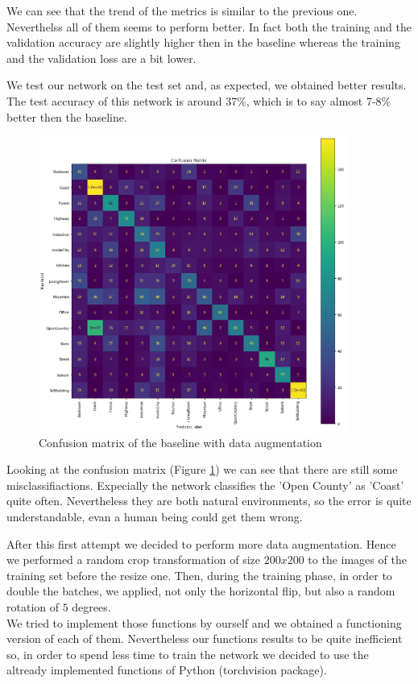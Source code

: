 \documentclass[12pt, a4paper]{report}
\begin{document}
We can see that the trend of the metrics is similar to the previous one. Neverthelss all of them seems to perform better. In fact both the training and the validation accuracy are slightly higher then in the baseline whereas the training and the validation loss are a bit lower. 

We test our network on the test set and, as expected, we obtained better results.\\
The test accuracy of this network is around 37\%, which is to say almost 7-8\% better then the baseline.

\begin{figure}[h!]
	\centering
	\includegraphics[width=0.9\textwidth]{img/aug_cmatrix}
	\caption{Confusion matrix of the baseline with data augmentation}
	\label{fig:augcmatrix}
\end{figure}

Looking at the confusion matrix (Figure \ref{fig:augcmatrix}) we can see that there are still some misclassifiactions. Expecially the network classifies the 'Open County' as 'Coast' quite often. Nevertheless they are both natural environments, so the error is quite understandable, evan a human being could get them wrong.

After this first attempt we decided to perform more data augmentation. Hence we performed a random crop transformation of size $200x200$ to the images of the training set before the resize one. Then, during the training phase, in order to double the batches, we applied, not only the horizontal flip, but also a random rotation of $5$ degrees.\\
We tried to implement those functions by ourself and we obtained a functioning version of each of them. Nevertheless our functions results to be quite inefficient so, in order to spend less time to train the network we decided to use the altready implemented functions of Python (torchvision package). 
\end{document}
